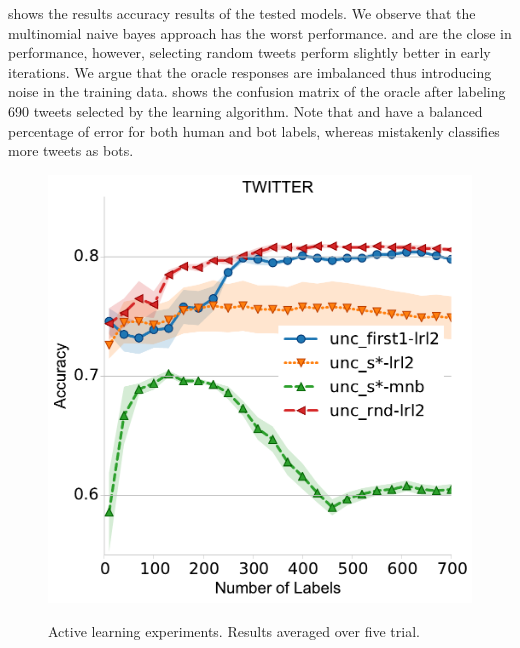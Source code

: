  shows the results accuracy results of the tested models. We observe that the multinomial naive bayes approach has the worst performance.  and  are the close in performance, however, selecting random tweets perform slightly better in early iterations. We argue that the oracle responses are imbalanced thus introducing noise in the training data.  shows the confusion matrix of the oracle after labeling 690 tweets selected by the learning algorithm. Note that  and  have a balanced percentage of error for both human and bot labels, whereas  mistakenly classifies more tweets as bots. 

\begin{figure}[t]
	\centering
				\includegraphics[width=0.9\columnwidth]{fig/sr-accuracy.pdf}
			\label{fig:class}	
		\vskip -0.15in
		\caption{Active learning experiments. Results averaged over five trial.}
		\label{fig:sr}
	\vskip -0.1in
\end{figure}

